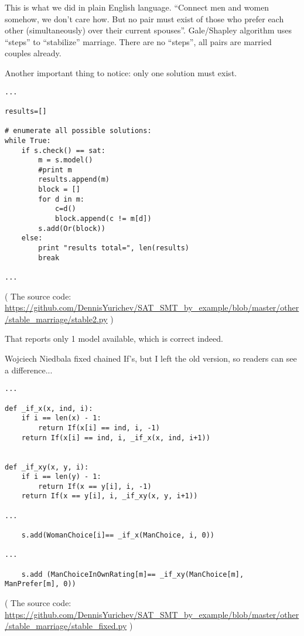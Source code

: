 This is what we did in plain English language.
``Connect men and women somehow, we don't care how.
But no pair must exist of those who prefer each other (simultaneously) over their current spouses''.
Gale/Shapley algorithm uses ``steps'' to ``stabilize'' marriage.
There are no ``steps'', all pairs are married couples already.

Another important thing to notice: only one solution must exist.

\begin{lstlisting}[style=custompy]
...

results=[]

# enumerate all possible solutions:
while True:
    if s.check() == sat:
        m = s.model()
        #print m
        results.append(m)
        block = []
        for d in m:
            c=d()
            block.append(c != m[d])
        s.add(Or(block))
    else:
        print "results total=", len(results)
        break

...
\end{lstlisting}

( The source code: \url{https://github.com/DennisYurichev/SAT_SMT_by_example/blob/master/other/stable_marriage/stable2.py} )

That reports only 1 model available, which is correct indeed.

Wojciech Niedbala fixed chained If's, but I left the old version, so readers can see a difference...

\begin{lstlisting}[style=custompy]
...

def _if_x(x, ind, i):
    if i == len(x) - 1:
        return If(x[i] == ind, i, -1)
    return If(x[i] == ind, i, _if_x(x, ind, i+1))


def _if_xy(x, y, i):
    if i == len(y) - 1:
        return If(x == y[i], i, -1)
    return If(x == y[i], i, _if_xy(x, y, i+1))

...

    s.add(WomanChoice[i]== _if_x(ManChoice, i, 0))

...

    s.add (ManChoiceInOwnRating[m]== _if_xy(ManChoice[m], ManPrefer[m], 0))
\end{lstlisting}

( The source code: \url{https://github.com/DennisYurichev/SAT_SMT_by_example/blob/master/other/stable_marriage/stable_fixed.py} )

